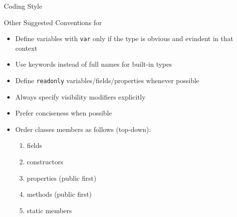 \documentclass[presentation]{beamer}
\begin{document}
\begin{frame}[allowframebreaks]{\csharp Coding Style}
    \begin{exampleblock}{Other Suggested Conventions for \csharp}
        \begin{itemize}
            \item Define variables with \alert{\texttt{var}} only if the type is \alert{obvious and evindent} in that context
            \item Use keywords instead of full names for built-in types
            \item Define \alert{\texttt{readonly}} variables/fields/properties whenever possible
            \item Always specify visibility modifiers explicitly
            \item Prefer conciseness when possible
            \item Order classes members as follows (top-down):
            \begin{enumerate}
                \item fields
                \item constructors
                \item properties (public first)
                \item methods (public first)
                \item static members
            \end{enumerate}
        \end{itemize}
    \end{exampleblock}


\end{frame}
\end{document}
